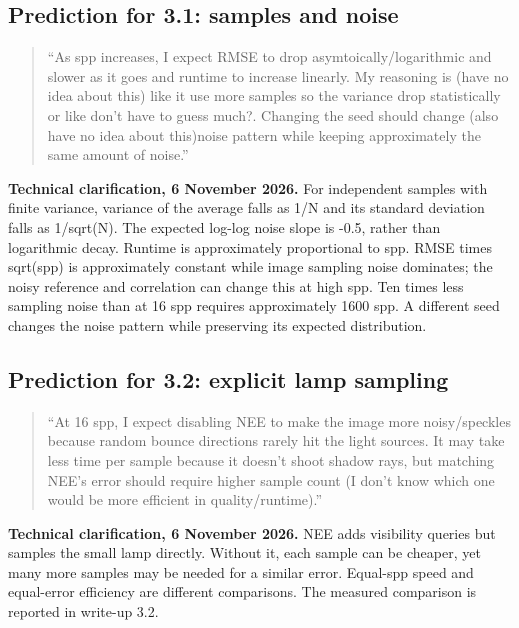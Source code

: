 \documentclass[11pt,a4paper]{article}
\begin{document}
\subsection*{Prediction for 3.1: samples and noise}
\begin{quote}\small
``As spp increases, I expect RMSE to drop asymtoically/\allowbreak{}logarithmic and slower as it goes and runtime to increase linearly. My reasoning is (have no idea about this) like it use more samples so the variance drop statistically or like don't have to guess much?. Changing the seed should change (also have no idea about this)noise pattern while keeping approximately the same amount of noise.''

\end{quote}
\textbf{Technical clarification, 6 November 2026.} For independent samples with finite variance, variance of the average falls as 1/\allowbreak{}N and its standard deviation falls as 1/\allowbreak{}sqrt(N). The expected log-log noise slope is -0.5, rather than logarithmic decay. Runtime is approximately proportional to spp. RMSE times sqrt(spp) is approximately constant while image sampling noise dominates; the noisy reference and correlation can change this at high spp. Ten times less sampling noise than at 16 spp requires approximately 1600 spp. A different seed changes the noise pattern while preserving its expected distribution.


\subsection*{Prediction for 3.2: explicit lamp sampling}
\begin{quote}\small
``At 16 spp, I expect disabling NEE to make the image more noisy/\allowbreak{}speckles because random bounce directions rarely hit the light sources. It may take less time per sample because it doesn't shoot shadow rays, but matching NEE's error should require higher sample count (I don't know which one would be more efficient in quality/\allowbreak{}runtime).''

\end{quote}
\textbf{Technical clarification, 6 November 2026.} NEE adds visibility queries but samples the small lamp directly. Without it, each sample can be cheaper, yet many more samples may be needed for a similar error. Equal-spp speed and equal-error efficiency are different comparisons. The measured comparison is reported in write-up 3.2.
\end{document}
